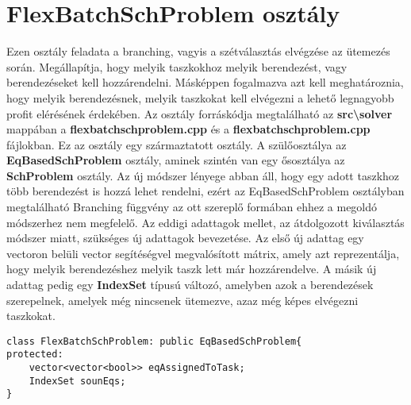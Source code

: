 \section{FlexBatchSchProblem osztály}
Ezen osztály feladata a branching, vagyis a szétválasztás elvégzése az ütemezés során. Megállapítja, hogy melyik taszkokhoz melyik berendezést, vagy berendezéseket kell hozzárendelni. Másképpen fogalmazva azt kell meghatároznia, hogy melyik berendezésnek, melyik taszkokat kell elvégezni a lehető legnagyobb profit elérésének érdekében. Az osztály forráskódja megtalálható az \textbf{src\textbackslash solver} mappában a \textbf{flexbatchschproblem.cpp} és a \textbf{flexbatchschproblem.cpp} fájlokban. Ez az osztály egy származtatott osztály. A szülőosztálya az \textbf{EqBasedSchProblem} osztály, aminek szintén van egy ősosztálya az \textbf{SchProblem} osztály. Az új módszer lényege abban áll, hogy egy adott taszkhoz több berendezést is hozzá lehet rendelni, ezért az EqBasedSchProblem osztályban megtalálható Branching függvény az ott szereplő formában ehhez a megoldó módszerhez nem megfelelő. Az eddigi adattagok mellet, az átdolgozott kiválasztás módszer miatt, szükséges új adattagok bevezetése. Az első új adattag egy vectoron belüli vector segítéségvel megvalósított mátrix, amely azt reprezentálja, hogy melyik berendezéshez melyik taszk lett már hozzárendelve. A másik új adattag pedig egy \textbf{IndexSet} típusú változó, amelyben azok a berendezések szerepelnek, amelyek még nincsenek ütemezve, azaz még képes elvégezni taszkokat.
\newpage
\begin{lstlisting}[caption={FlexBatchSchProblem osztály adattagjai}]
class FlexBatchSchProblem: public EqBasedSchProblem{
protected:
	vector<vector<bool>> eqAssignedToTask;
    IndexSet sounEqs;
}
\end{lstlisting}
